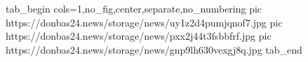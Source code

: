  
 
 
 
 

\ifcmt
  tab_begin cols=1,no_fig,center,separate,no_numbering
     pic https://donbas24.news/storage/news/uy1z2d4pumjqnof7.jpg
		 pic https://donbas24.news/storage/news/pxx2j44t3fsbbfrf.jpg
		 pic https://donbas24.news/storage/news/gnp9lh630vexgj8q.jpg
  tab_end
\fi
